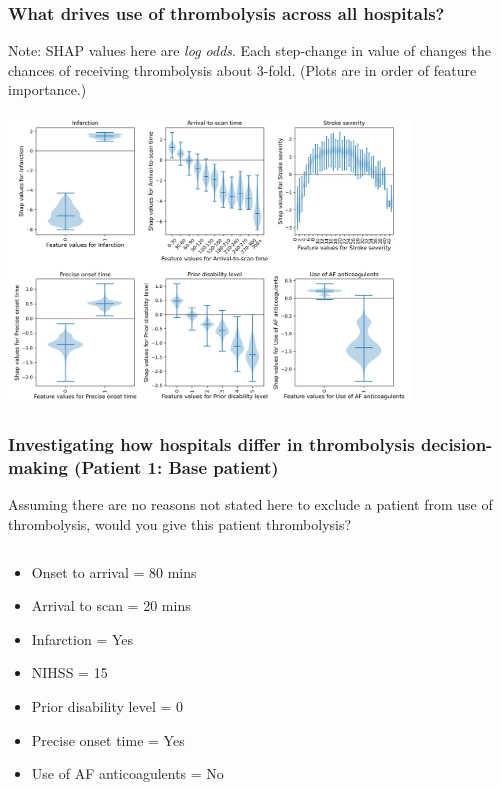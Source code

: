 \documentclass{beamer}
\begin{document}

\begin{frame}
\frametitle{What drives use of thrombolysis across all hospitals?}

\footnotesize{Note: SHAP values here are \emph{log odds}. Each step-change in value of  changes the chances of receiving thrombolysis about 3-fold. (Plots are in order of feature importance.)}

\begin{center}
\includegraphics[width=0.80\textwidth]{./images/xgb_thrombolysis_shap_violin.jpg}
\end{center}
\end{frame}


\begin{frame}
\frametitle{Investigating how hospitals differ in thrombolysis decision-making (Patient 1: Base patient)}

Assuming there are no reasons not stated here to exclude a patient from use of thrombolysis, would you give this patient thrombolysis?

\vspace{3mm}

\begin{columns}
    \begin{column}{0.6\textwidth}
        \begin{itemize}
            \item Onset to arrival = 80 mins
            \item Arrival to scan = 20 mins
            \item Infarction = Yes
            \item NIHSS = 15
            \item Prior disability level = 0
            \item Precise onset time = Yes
            \item Use of AF anticoagulents = No
        \end{itemize}
    \end{column}
    
    \begin{column}{0.4\textwidth}
    
    \end{column}

\end{columns}
\end{frame}
\end{document}
